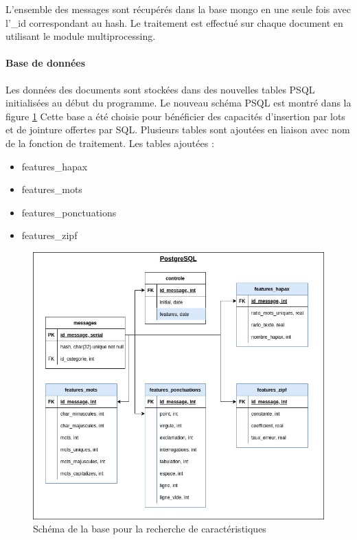             L'ensemble des messages sont récupérés dans la base mongo en une seule fois avec l'\_id correspondant au hash.
            Le traitement est effectué sur chaque document en utilisant le module multiprocessing.

        \paragraph{Base de données}
            Les données des documents sont stockées dans des nouvelles tables PSQL initialisées au début du programme.
            Le nouveau schéma PSQL est montré dans la figure \ref{fig:feat_db}
            Cette base a été choisie pour bénéficier des capacités d'insertion par lots et de jointure offertes par SQL\@.
            Plusieurs tables sont ajoutées en liaison avec nom de la fonction de traitement.
            Les tables ajoutées :
            \begin{itemize}
                \item features\_hapax
                \item features\_mots
                \item features\_ponctuations
                \item features\_zipf
            \end{itemize}
            \begin{figure}[H]
                \includegraphics[width=\linewidth]{img/features_bdd}
                \caption{Schéma de la base pour la recherche de caractéristiques}
                \label{fig:feat_db}
            \end{figure}

